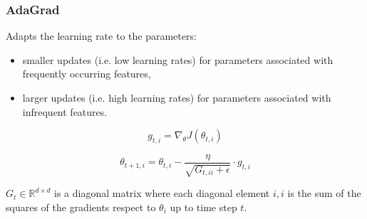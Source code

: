 \documentclass{beamer}
\begin{document}
\begin{frame}
    \frametitle{AdaGrad}
    

    
    Adapts the learning rate to the parameters:
    \begin{itemize}
        \item smaller updates (i.e. low learning rates) for parameters associated with frequently occurring features,
        \item larger updates (i.e. high learning rates) for parameters associated with infrequent features.
    \end{itemize}
    
    
    
    \begin{equation}
        g_{t, i}=\nabla_{\theta} J\left(\theta_{t, i}\right)
    \end{equation}
    
    \begin{equation}
\theta_{t+1, i}=\theta_{t, i}-\frac{\eta}{\sqrt{G_{t, i i}+\epsilon}} \cdot g_{t, i}
\end{equation}

$G_{t} \in \mathbb{R}^{d \times d}$ is a diagonal matrix where each diagonal element $i,i$ is the sum of the squares of the gradients respect to $\theta_i$ up to time step $t$.

\end{frame}
\end{document}
